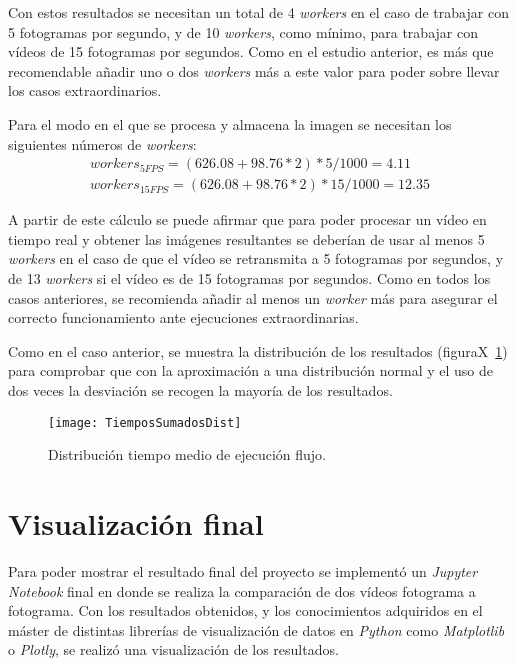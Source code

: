 {Con estos resultados se necesitan un total de 4 \textit{workers} en el caso de trabajar con 5 fotogramas por segundo, y de 10 \textit{workers}, como mínimo, para trabajar con vídeos de 15 fotogramas por segundos. Como en el estudio anterior, es más que recomendable añadir uno o dos \textit{workers} más a este valor para poder sobre llevar los casos extraordinarios.

Para el modo en el que se procesa y almacena la imagen se necesitan los siguientes números de \textit{workers}:
\begin{equation}
\begin{split}
workers_{5FPS} = (626.08 + 98.76*2)*5/1000 = 4.11\\
workers_{15FPS} = (626.08 + 98.76*2)*15/1000 = 12.35
\end{split}
\end{equation}

A partir de este cálculo se puede afirmar que para poder procesar un vídeo en tiempo real y obtener las imágenes resultantes se deberían de usar al menos 5 \textit{workers} en el caso de que el vídeo se retransmita a 5 fotogramas por segundos, y de 13 \textit{workers} si el vídeo es de 15 fotogramas por segundos. Como en todos los casos anteriores, se recomienda añadir al menos un \textit{worker} más para asegurar el correcto funcionamiento ante ejecuciones extraordinarias.

Como en el caso anterior, se muestra la distribución de los resultados (figuraX~\ref{fig:dist2}) para comprobar que con la aproximación a una distribución normal y el uso de dos veces la desviación se recogen la mayoría de los resultados.

\begin{figure}[h]
	\centering
	\texttt{[image: TiemposSumadosDist]}
	\caption{Distribución tiempo medio de ejecución flujo.}
	\label{fig:dist2}
\end{figure}

\section{Visualización final}
Para poder mostrar el resultado final del proyecto se implementó un \textit{Jupyter Notebook} final en donde se realiza la comparación de dos vídeos fotograma a fotograma. Con los resultados obtenidos, y los conocimientos adquiridos en el máster de distintas librerías de visualización de datos en \textit{Python} como \textit{Matplotlib} o \textit{Plotly}, se realizó una visualización de los resultados.

}
